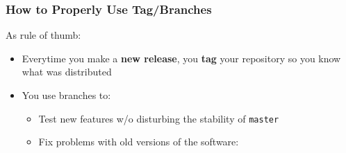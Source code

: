 \begin{frame}
  \frametitle{How to Properly Use Tag/Branches}

  As rule of thumb:

  \vspace{1em}

  \begin{itemize}
    \item Everytime you make a \textbf{new release}, you \textbf{tag} your
      repository so you know what was distributed
    \item You use branches to:
      \begin{itemize}
        \item Test new features w/o disturbing the stability of \texttt{master}
        \item Fix problems with old versions of the software:

          \vspace{1em}
          \giteleven
      \end{itemize}
  \end{itemize}
\end{frame}
